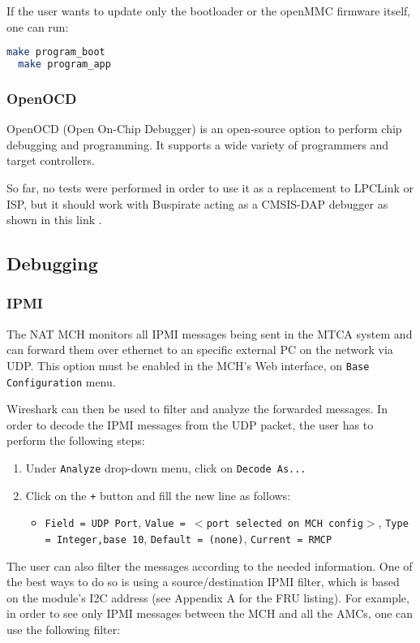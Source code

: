 \documentclass[letterpaper,12pt, titlepage]{article}
\begin{document}
If the user wants to update only the bootloader or the openMMC firmware itself, one can run:

\begin{lstlisting}[language=bash]
  make program_boot
  make program_app
\end{lstlisting}

\subsubsection{OpenOCD}
OpenOCD (Open On-Chip Debugger) is an open-source option to perform chip debugging and programming. It supports a wide variety of programmers and target controllers.

So far, no tests were performed in order to use it as a replacement to LPCLink or ISP, but it should work with Buspirate acting as a CMSIS-DAP debugger as shown in this link \cite{buspirate-debug}.

\subsection{Debugging}

\subsubsection{IPMI}
The NAT MCH monitors all IPMI messages being sent in the MTCA system and can forward them over ethernet to an specific external PC on the network via UDP. This option must be enabled in the MCH's Web interface, on \texttt{Base Configuration} menu.

Wireshark can then be used to filter and analyze the forwarded messages. In order to decode the IPMI messages from the UDP packet, the user has to perform the following steps:

\begin{enumerate}
\item Under \texttt{Analyze} drop-down menu, click on \texttt{Decode As...}
\item Click on the \texttt{+} button and fill the new line as follows:
  \begin{itemize}
  \item \texttt{Field = UDP Port}, \texttt{Value = $<$port selected on MCH config$>$}, \texttt{Type = Integer,base 10}, \texttt{Default = (none)}, \texttt{Current = RMCP}
  \end{itemize}
\end{enumerate}

The user can also filter the messages according to the needed information. One of the best ways to do so is using a source/destination IPMI filter, which is based on the module's I2C address (see Appendix A for the FRU listing). For example, in order to see only IPMI messages between the MCH and all the AMCs, one can use the following filter:
\end{document}
